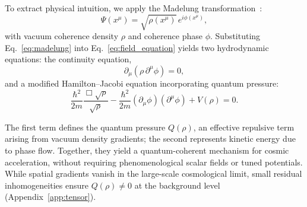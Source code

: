 To extract physical intuition, we apply the Madelung transformation~\cite{Madelung1927}:
\begin{equation}
\Psi(x^\mu) = \sqrt{\rho(x^\mu)}\, e^{i\phi(x^\mu)},
\label{eq:madelung}
\end{equation}
with vacuum coherence density \( \rho \) and coherence phase \( \phi \). Substituting Eq.~\eqref{eq:madelung} into Eq.~\eqref{eq:field_equation} yields two hydrodynamic equations: the continuity equation,
\begin{equation}
\partial_\mu (\rho\,\partial^\mu\phi) = 0,
\label{eq:continuity_1}
\end{equation}
and a modified Hamilton–Jacobi equation incorporating quantum pressure:
\begin{equation}
\frac{\hbar^2}{2m}\frac{\Box\sqrt{\rho}}{\sqrt{\rho}} - \frac{\hbar^2}{2m}(\partial_\mu\phi)(\partial^\mu\phi) + V(\rho) = 0.
\label{eq:hamilton_jacobi}
\end{equation}

The first term defines the quantum pressure \( Q(\rho) \), an effective repulsive term arising from vacuum density gradients; the second represents kinetic energy due to phase flow. Together, they yield a quantum-coherent mechanism for cosmic acceleration, without requiring phenomenological scalar fields or tuned potentials. While spatial gradients vanish in the large-scale cosmological limit, small residual inhomogeneities ensure \( Q(\rho) \neq 0 \) at the background level (Appendix~\ref{app:tensor}).

